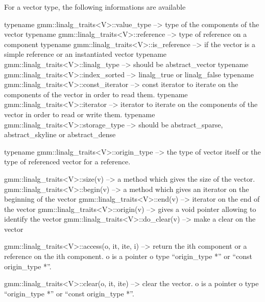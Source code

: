 \documentclass[11pt,a4paper]{article}
\begin{document}
For a vector type, the following informations are available
\begin{cppcode}
  typename gmm::linalg_traits<V>::value_type     --> type of the components of the
                                                     vector
  typename gmm::linalg_traits<V>::reference      --> type of reference on a component
  typename gmm::linalg_traits<V>::is_reference   --> if the vector is a simple
                                                     reference or an instantiated vector
  typename gmm::linalg_traits<V>::linalg_type    --> should be abstract_vector
  typename gmm::linalg_traits<V>::index_sorted    --> linalg_true or linalg_false
  typename gmm::linalg_traits<V>::const_iterator --> const iterator to iterate on the
                                                     components of the vector in 
                                                     order to read them.
  typename gmm::linalg_traits<V>::iterator       --> iterator to iterate on the
                                                     components of the vector in
                                                     order to read or write them.
  typename gmm::linalg_traits<V>::storage_type   --> should be abstract_sparse,
                                                     abstract_skyline or
                                                     abstract_dense

  typename gmm::linalg_traits<V>::origin_type    --> the type of vector itself
                                                     or the type of referenced
                                                     vector for a reference.
 
  gmm::linalg_traits<V>::size(v)     --> a method which gives the size of the vector.
  gmm::linalg_traits<V>::begin(v)    --> a method which gives an iterator on the
                                         beginning of the vector
  gmm::linalg_traits<V>::end(v)      --> iterator on the end of the vector
  gmm::linalg_traits<V>::origin(v)   --> gives a void pointer allowing to identify
                                         the vector
  gmm::linalg_traits<V>::do_clear(v) --> make a clear on the vector

  gmm::linalg_traits<V>::access(o, it, ite, i) --> return the ith component or a
                                          reference on the ith component. o is a
                                          pointer o type ``origin_type *'' or 
                                          ``const origin_type *''.

  gmm::linalg_traits<V>::clear(o, it, ite) --> clear the vector. o is a
                                          pointer o type ``origin_type *'' or 
                                          ``const origin_type *''.
\end{cppcode}
\end{document}
